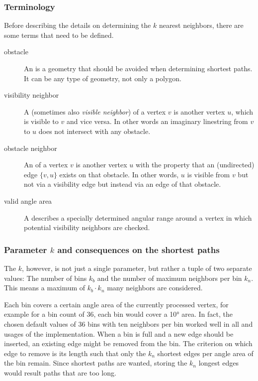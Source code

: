 		\subsubsection{Terminology}
		
			Before describing the details on determining the $k$ nearest neighbors, there are some terms that need to be defined.
			
			\begin{description}
				\item[obstacle] An  is a geometry that should be avoided when determining shortest paths. It can be any type of geometry, not only a polygon.
				\item[visibility neighbor] A  (sometimes also \emph{visible neighbor}) of a vertex $v$ is another vertex $u$, which is visible to $v$ and vice versa. In other words an imaginary linestring from $v$ to $u$ does not intersect with any obstacle.
				\item[obstacle neighbor] An  of a vertex $v$ is another vertex $u$ with the property that an (undirected) edge $\{v, u\}$ exists on that obstacle. In other words, $u$ is visible from $v$ but not via a visibility edge but instead via an edge of that obstacle.
				\item[valid angle area] A  describes a specially determined angular range around a vertex in which potential visibility neighbors are checked.
			\end{description}
		
		\subsubsection{Parameter $k$ and consequences on the shortest paths}
		
			The $k$, however, is not just a single parameter, but rather a tuple of two separate values:
			The number of bins $k_b$ and the number of maximum neighbors per bin $k_n$.
			This means a maximum of $k_b \cdot k_n$ many neighbors are considered.
			
			Each bin covers a certain angle area of the currently processed vertex, for example for a bin count of 36, each bin would cover a 10° area.
			In fact, the chosen default values of 36 bins with ten neighbors per bin worked well in all and usages of the implementation.
			When a bin is full and a new edge should be inserted, an existing edge might be removed from the bin.
			The criterion on which edge to remove is its length such that only the $k_n$ shortest edges per angle area of the bin remain.
			Since shortest paths are wanted, storing the $k_n$ longest edges would result paths that are too long.
			
